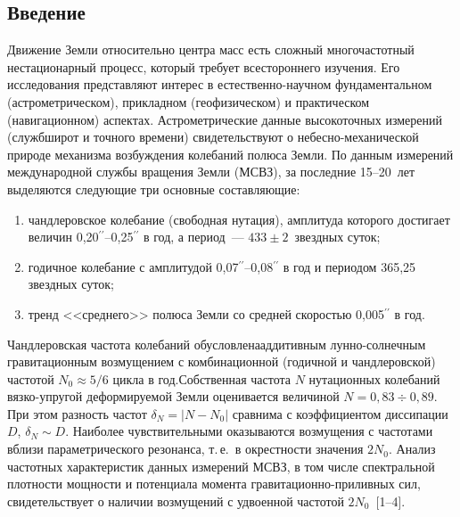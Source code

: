 
\thispagestyle{headings}

\begin{multicols}{2}

\section{Введение}

Движение Земли относительно центра масс есть сложный многочастотный
нестационарный процесс, который требует всестороннего изучения. Его
исследования представляют интерес в естественно-научном
фундаментальном (астро\-мет\-ри\-ческом), прикладном (геофизическом) и
практическом (навигационном) аспектах. Астрометрические данные
высокоточных измерений (служб\linebreak широт и точного времени)
свидетельствуют о не\-бес\-но-механической природе механизма воз\-буж\-де\-ния
колебаний полюса Земли. По данным измерений международной службы
вращения Земли (МСВЗ), за последние 15--20~лет выделяются
следующие три основные составляющие: 
\begin{enumerate}[(1)]
\item %
чандлеровское колебание
(свободная нутация), амплитуда которого достигает величин
0,20$^{\prime\prime}$--0,25$^{\prime\prime}$ в год, а период~---
$433 \pm 2$~звездных суток;
{

} 
\item %
годичное колебание с амплитудой 0,07$^{\prime\prime}$--0,08$^{\prime\prime}$ 
в год и периодом 365,25 звездных суток; 
\item %
тренд <<среднего>> полюса Земли со средней скоростью 0,005$^{\prime\prime}$ в год. 
\end{enumerate}
Чандлеровская частота колебаний обуслов\-лена\linebreak аддитивным 
лунно-солнечным гравитационным возмущением с комбинационной (годичной и 
чандлеровской) частотой $N_0 \approx 5/6$ цикла в год.\linebreak Собственная 
частота $N$ нутационных колебаний вязко-упругой деформируемой Земли оценивается 
величиной $N=0{,}83 \div 0{,}89$. При этом разность час\-тот $\delta_N =\vert 
N-N_0\vert$ сравнима с коэффициентом диссипации $D$, $\delta_N \sim D$. 
Наиболее чувствительными оказываются возмущения с частотами вблизи 
параметрического резонанса, т.\,е.\ в окрестности значения $2N_0$. Анализ 
частотных характеристик данных измерений \mbox{МСВЗ}, в том числе спектральной 
плотности мощности и потенциала момента гравитационно-приливных сил, 
свидетельствует о наличии возмущений с удвоенной частотой $2N_0$~\mbox{[1--4]}.
{

}
\end{multicols}
